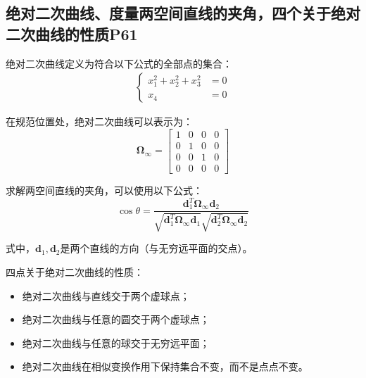 \documentclass[11pt]{article}
\begin{document}
\subsection{	绝对二次曲线、度量两空间直线的夹角，四个关于绝对二次曲线的性质P61}
绝对二次曲线定义为符合以下公式的全部点的集合：
\begin{align*}
  \left\{
  \begin{aligned}
    x_1^2+x_2^2+x_3^2 & =0 \\
    x_4               & =0
  \end{aligned}
  \right.
\end{align*}\par
在规范位置处，绝对二次曲线可以表示为：
\begin{equation*}
  \mathbold{\Omega}_\infty=\begin{bmatrix}
    1 & 0 & 0 & 0 \\
    0 & 1 & 0 & 0 \\
    0 & 0 & 1 & 0 \\
    0 & 0 & 0 & 0
  \end{bmatrix}
\end{equation*}\par
求解两空间直线的夹角，可以使用以下公式：
\begin{equation*}
  \cos\theta=\frac{\mathbold{d}_1^T\mathbold{\Omega}_\infty\mathbold{d}_2}{\sqrt{\mathbold{d}_1^T\mathbold{\Omega}_\infty\mathbold{d}_1}\sqrt{\mathbold{d}_2^T\mathbold{\Omega}_\infty\mathbold{d}_2}}
\end{equation*}\par
式中，$\mathbf{d}_1,\mathbf{d}_2$是两个直线的方向（与无穷远平面的交点）。\par
四点关于绝对二次曲线的性质：
\begin{itemize}
  \item 绝对二次曲线与直线交于两个虚球点；
  \item 绝对二次曲线与任意的圆交于两个虚球点；
  \item 绝对二次曲线与任意的球交于无穷远平面；
  \item 绝对二次曲线在相似变换作用下保持集合不变，而不是点点不变。
\end{itemize}
\end{document}
